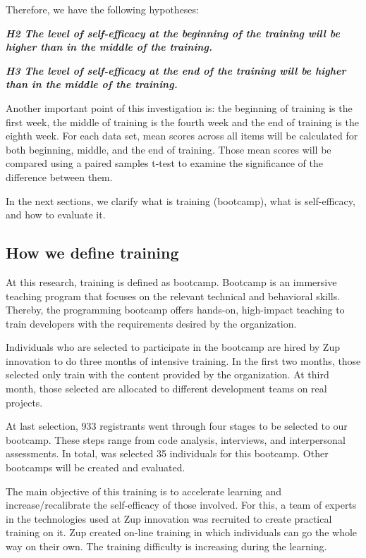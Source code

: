 \documentclass{TheMartianReport}
\begin{document}
Therefore, we have the following hypotheses:
 \newline

\textbf{\textit{H2 The level of self-efficacy at the beginning of the training will be higher than in the middle of the training.}} \newline

\textbf{\textit{H3 The level of self-efficacy at the end of the training will be higher than in the middle of the training.}}
 \newline


Another important point of this investigation is: the beginning of training is the first week, the middle of training is the fourth week and the end of training is the eighth week. For each data set, mean scores across all items will be calculated for both beginning, middle, and the end of training. Those mean scores will be compared using a paired samples t-test to examine the significance of the difference between them. 


In the next sections, we clarify what is training (bootcamp), what is self-efficacy, and how to evaluate it. 



\subsection{How we define training}
At this research, training is defined as bootcamp. Bootcamp is an immersive teaching program that focuses on the relevant technical and behavioral skills. Thereby, the programming bootcamp offers hands-on, high-impact teaching to train developers with the requirements desired by the organization.

Individuals who are selected to participate in the bootcamp are hired by Zup innovation to do three months of intensive training. In the first two months, those selected only train with the content provided by the organization. At third month, those selected are allocated to different development teams on real projects.

At last selection, 933 registrants went through four stages to be selected to our bootcamp. These steps range from code analysis, interviews, and interpersonal assessments. In total, was selected 35 individuals for this bootcamp. Other bootcamps will be created and evaluated. 

The main objective of this training is to accelerate learning and increase/recalibrate the self-efficacy of those involved. For this, a team of experts in the technologies used at Zup innovation was recruited to create practical training on it. Zup created on-line training in which individuals can go the whole way on their own. The training difficulty is increasing during the learning. 
\end{document}
